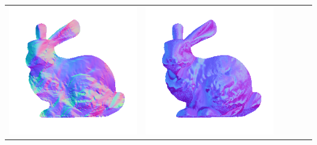\begin{tabularx}{\linewidth}{@{}Y@{}Y@{}Y@{}Y@{}Y@{}Y@{}}
\includegraphics[width=\linewidth]{semisynthetic/20160617_14_yu_out.png} &
\includegraphics[width=\linewidth]{semisynthetic/20160617_14_dpsn_out.png} &

\end{tabularx}
